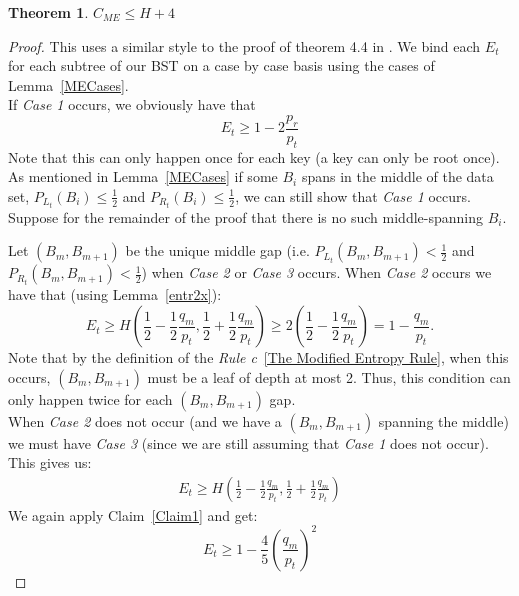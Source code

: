 \documentclass[]{beamer}
\theoremstyle{plain}
\newtheorem{thm}{Theorem}[section]
\begin{document}
\begin{frame}
\begin{thm}
$C_{ME} \leq H + 4$
\end{thm}

\begin{proof}
This uses a similar style to the proof of theorem 4.4 in \cite{bayer1975improved}.
We bind each $E_t$ for each subtree of our BST on a case by case basis using the cases of Lemma~\ref{MECases}.\\
If \textit{Case 1} occurs, we obviously have that
\begin{equation}\label{EQC1}
E_t \geq 1-2 \frac{p_r}{p_t}
\end{equation}
Note that this can only happen once for each key (a key can only be root once). \\

As mentioned in Lemma~\ref{MECases} if some $B_i$ spans in the middle of the data set, $P_{L_t}(B_i) \leq \frac{1}{2}$ and $P_{R_t}(B_i) \leq \frac{1}{2}$, we can still show that \textit{Case 1} occurs. Suppose for the remainder of the proof that there is no such middle-spanning $B_i$.

Let $(B_m, B_{m+1})$ be the unique middle gap (i.e. $P_{L_t}(B_m, B_{m+1}) < \frac{1}{2}$ and $P_{R_t}(B_m, B_{m+1}) < \frac{1}{2}$) when \textit{Case 2} or \textit{Case 3} occurs. When \textit{Case 2} occurs we have that (using Lemma~\ref{entr2x}):
\begin{equation}\label{EQC2} 
E_t \geq H(\frac{1}{2}-\frac{1}{2} \frac{q_m}{p_t}, \frac{1}{2} + \frac{1}{2} \frac{q_m}{p_t}) \geq 2(\frac{1}{2}-\frac{1}{2} \frac{q_m}{p_t})=1-\frac{q_m}{p_t}.
\end{equation}
Note that by the definition of the \textit{Rule c}~\ref{The Modified Entropy Rule}, when this occurs, $(B_m, B_{m+1})$ must be a leaf of depth at most 2. Thus, this condition can only happen twice for each $(B_m, B_{m+1})$ gap. \\

When \textit{Case 2} does not occur (and we have a $(B_m, B_{m+1})$ spanning the middle) we must have \textit{Case 3} (since we are still assuming that \textit{Case 1} does not occur). This gives us:
\begin{align*}
E_t \geq H(\frac{1}{2}-\frac{1}{2} \frac{q_m}{p_t}, \frac{1}{2} + \frac{1}{2} \frac{q_m}{p_t})
\end{align*}
We again apply Claim~\ref{Claim1} and get:
\begin{equation}\label{EQC3}
E_t \geq 1- \frac{4}{5} (\frac{q_m}{p_t})^2
\end{equation}


\end{proof}
\end{frame}
\end{document}
